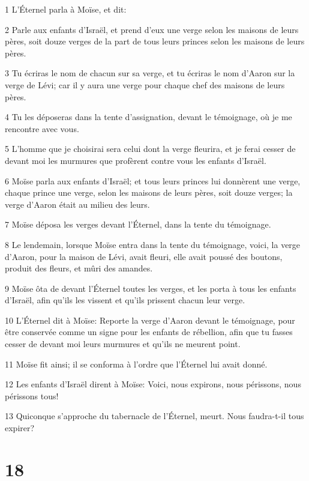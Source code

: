 \par 1 L'Éternel parla à Moïse, et dit:
\par 2 Parle aux enfants d'Israël, et prend d'eux une verge selon les maisons de leurs pères, soit douze verges de la part de tous leurs princes selon les maisons de leurs pères.
\par 3 Tu écriras le nom de chacun sur sa verge, et tu écriras le nom d'Aaron sur la verge de Lévi; car il y aura une verge pour chaque chef des maisons de leurs pères.
\par 4 Tu les déposeras dans la tente d'assignation, devant le témoignage, où je me rencontre avec vous.
\par 5 L'homme que je choisirai sera celui dont la verge fleurira, et je ferai cesser de devant moi les murmures que profèrent contre vous les enfants d'Israël.
\par 6 Moïse parla aux enfants d'Israël; et tous leurs princes lui donnèrent une verge, chaque prince une verge, selon les maisons de leurs pères, soit douze verges; la verge d'Aaron était au milieu des leurs.
\par 7 Moïse déposa les verges devant l'Éternel, dans la tente du témoignage.
\par 8 Le lendemain, lorsque Moïse entra dans la tente du témoignage, voici, la verge d'Aaron, pour la maison de Lévi, avait fleuri, elle avait poussé des boutons, produit des fleurs, et mûri des amandes.
\par 9 Moïse ôta de devant l'Éternel toutes les verges, et les porta à tous les enfants d'Israël, afin qu'ils les vissent et qu'ils prissent chacun leur verge.
\par 10 L'Éternel dit à Moïse: Reporte la verge d'Aaron devant le témoignage, pour être conservée comme un signe pour les enfants de rébellion, afin que tu fasses cesser de devant moi leurs murmures et qu'ils ne meurent point.
\par 11 Moïse fit ainsi; il se conforma à l'ordre que l'Éternel lui avait donné.
\par 12 Les enfants d'Israël dirent à Moïse: Voici, nous expirons, nous périssons, nous périssons tous!
\par 13 Quiconque s'approche du tabernacle de l'Éternel, meurt. Nous faudra-t-il tous expirer?

\chapter{18}

